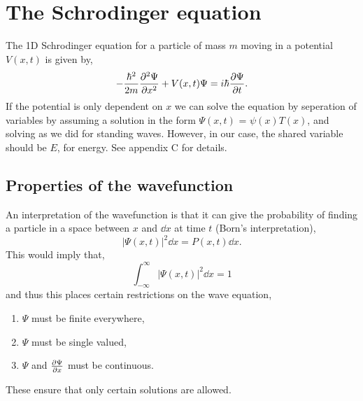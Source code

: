 \documentclass{book}
\begin{document}
\chapter{The Schrodinger equation}
The 1D Schrodinger equation for a particle of mass $m$ moving in a potential $V(x,t)$ is given by,
\begin{equation}
	-\frac{\hbar^2}{2m}\pdv[2]{\Psi}{x} + V(x,t)\Psi = i\hbar \pdv{\Psi}{t}.
\end{equation}
If the potential is only dependent on $x$ we can solve the equation by seperation of variables by assuming a solution in the form $\Psi(x,t)$ = $\psi(x)T(x)$, and solving as we did for standing waves. However, in our case, the shared variable should be $E$, for energy. See appendix C for details.
\section{Properties of the wavefunction}
An interpretation of the wavefunction is that it can give the probability of finding a particle in a space between $x$ and $\dd{x}$ at time $t$ (Born's interpretation),
\begin{equation}
	|\Psi(x,t)|^2\dd{x}= P(x,t)\dd{x}.
\end{equation}
This would imply that,
\begin{equation}
	\int_{-\infty}^{\infty}|\Psi(x,t)|^2\dd{x} = 1 \label{probablility}
\end{equation}
and thus this places certain restrictions on the wave equation,
\begin{enumerate}
	\item $\Psi$ must be finite everywhere,
	\item $\Psi$ must be single valued,
	\item $\Psi$ and $\pdv{\Psi}{x}$ must be continuous. 
\end{enumerate}
These ensure that only certain solutions are allowed.
\end{document}
